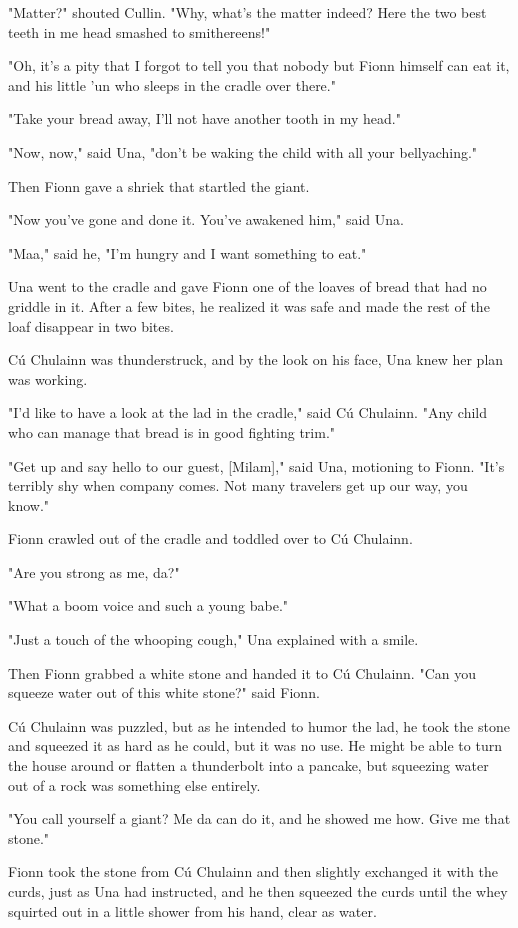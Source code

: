 "Matter?" shouted Cullin. "Why, what's the matter indeed? Here the two best teeth in me head smashed to smithereens!"

"Oh, it's a pity that I forgot to tell you that nobody but Fionn himself can eat it, and his little 'un who sleeps in the cradle over there."

"Take your bread away, I'll not have another tooth in my head."

"Now, now," said Una, "don't be waking the child with all your bellyaching."

Then Fionn gave a shriek that startled the giant.

"Now you've gone and done it. You've awakened him," said Una.

"Maa," said he, "I'm hungry and I want something to eat."

Una went to the cradle and gave Fionn one of the loaves of bread that had no griddle in it. After a few bites, he realized it was safe and made the rest of the loaf disappear in two bites.

Cú Chulainn was thunderstruck, and by the look on his face, Una knew her plan was working.

"I'd like to have a look at the lad in the cradle," said Cú Chulainn. "Any child who can manage that bread is in good fighting trim."

"Get up and say hello to our guest, [Milam]," said Una, motioning to Fionn. "It's terribly shy when company comes. Not many travelers get up our way, you know."

Fionn crawled out of the cradle and toddled over to Cú Chulainn.

"Are you strong as me, da?"

"What a boom voice and such a young babe."

"Just a touch of the whooping cough," Una explained with a smile.

Then Fionn grabbed a white stone and handed it to Cú Chulainn. "Can you squeeze water out of this white stone?" said Fionn.

Cú Chulainn was puzzled, but as he intended to humor the lad, he took the stone and squeezed it as hard as he could, but it was no use. He might be able to turn the house around or flatten a thunderbolt into a pancake, but squeezing water out of a rock was something else entirely.

"You call yourself a giant? Me da can do it, and he showed me how. Give me that stone."

Fionn took the stone from Cú Chulainn and then slightly exchanged it with the curds, just as Una had instructed, and he then squeezed the curds until the whey squirted out in a little shower from his hand, clear as water.


